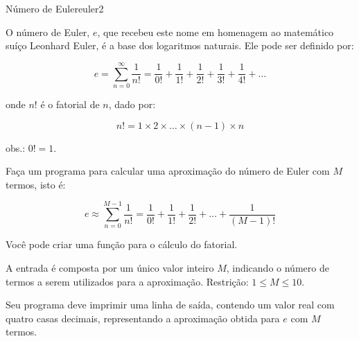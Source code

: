 \documentclass[12pt,a4paper,oneside]{article}
\begin{document}
\begin{problem}{Número de Euler}{euler}{2}

O número de Euler, $e$, que recebeu este nome em homenagem ao matemático suíço Leonhard Euler, é a base dos logaritmos naturais. Ele pode ser definido por:

$$e=\sum_{n=0}^\infty{\frac{1}{n!}}=\frac{1}{0!}+\frac{1}{1!}+\frac{1}{2!}+\frac{1}{3!}+\frac{1}{4!}+\dots$$

onde $n!$ é o fatorial de $n$, dado por:

$$n! = 1\times 2 \times \dots \times (n-1) \times n$$

obs.: $0!=1$.

Faça um programa para calcular uma aproximação do número de Euler com $M$ termos, isto é:

$$e \approx \sum_{n=0}^{M-1}{\frac{1}{n!}}=\frac{1}{0!}+\frac{1}{1!}+\frac{1}{2!}+\dots+\frac{1}{(M-1)!}$$

\Notes

Você pode criar uma função para o cálculo do fatorial.

\InputFile

A entrada é composta por um único valor inteiro $M$, indicando o número de termos a serem utilizados para a aproximação. Restrição:
$1 \leq M \leq 10$.

\OutputFile

Seu programa deve imprimir uma linha de saída, contendo um valor real com quatro casas decimais, representando a aproximação obtida para $e$ com $M$ termos.


\Example

\begin{example}
%
\end{example}

\begin{example}
%
\end{example}

\begin{example}
%
\end{example}


\end{problem}
\end{document}
